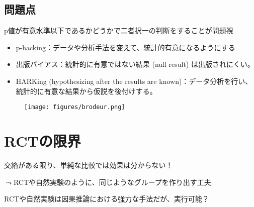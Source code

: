 \documentclass[
  xelatex,
  ja=standard]{bxjsarticle}
\providecommand{\tightlist}{%
  \setlength{\itemsep}{0pt}\setlength{\parskip}{0pt}}\usepackage{longtable,booktabs,array}
\begin{document}
\hypertarget{ux554fux984cux70b9}{%
\subsection{問題点}\label{ux554fux984cux70b9}}

p値が有意水準以下であるかどうかで二者択一の判断をすることが問題視

\begin{itemize}
\tightlist
\item
  p-hacking：データや分析手法を変えて、統計的有意になるようにする
\item
  出版バイアス：統計的に有意ではない結果 (null result)
  は出版されにくい。
\item
  HARKing (hypothesizing after the results are
  known)：データ分析を行い、統計的に有意な結果から仮説を後付けする。
\end{itemize}

\begin{figure}[htpb]

{\centering \texttt{[image: figures/brodeur.png]}

}

\caption{\citet{brodeur2020}}

\end{figure}

\hypertarget{rctux306eux9650ux754c}{%
\section{RCTの限界}\label{rctux306eux9650ux754c}}

交絡がある限り、単純な比較では効果は分からない！

\(\leadsto\)RCTや自然実験のように、同じようなグループを作り出す工夫

RCTや自然実験は因果推論における強力な手法だが、実行可能？
\end{document}
